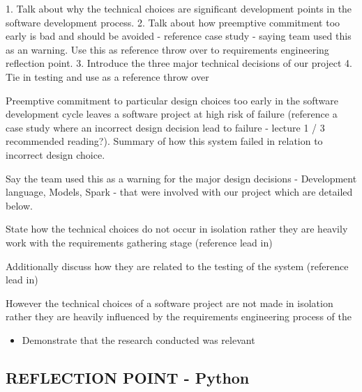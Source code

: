 \documentclass{l3proj}
\begin{document}


1. Talk about why the technical choices are significant development points in the software development process.
2. Talk about how preemptive commitment too early is bad and should be avoided - reference case study - saying team used this as an warning. Use this as reference throw over to requirements engineering reflection point. 
3. Introduce the three major technical decisions of our project
4. Tie in testing and use as a reference throw over

Preemptive commitment to particular design choices too early in the software development cycle leaves a software project at high risk of failure (reference a case study where an incorrect design decision lead to failure - lecture 1 / 3 recommended reading?). Summary of how this system failed in relation to incorrect design choice. 

Say the team used this as a warning for the major design decisions - Development language, Models, Spark - that were involved with our project which are detailed below.

State how the technical choices do not occur in isolation rather they are heavily work with the requirements gathering stage (reference lead in)

Additionally discuss how they are related to the testing of the system (reference lead in) 

However the technical choices of a software project are not made in isolation rather they are heavily influenced by the requirements engineering process of the 

\begin{itemize}
\item Demonstrate that the research conducted was relevant
\end{itemize}


\subsection{REFLECTION POINT - Python}
\label{sec:pyreflection}
\end{document}
